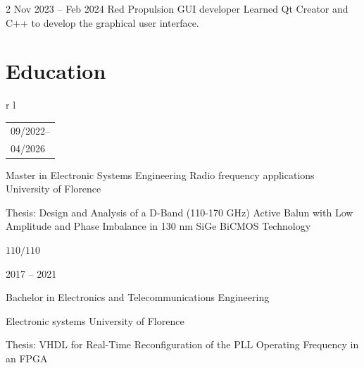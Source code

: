 \documentclass[
	10pt, %
]{FreemanCV}
\begin{document}
\begin{paracol}{2}
\jobentry
	{Nov 2023 -- Feb 2024} %
	{} %
	{Red Propulsion} %
	{GUI developer} %
	{Learned Qt Creator and C++ to develop the  graphical user interface.} %
%
\section{Education} 





\begin{supertabular}{r l} %

    \qualificationentrySecondType
    {\begin{tabular}[t]{@{}l@{}}
        09/2022--\\[-0.2em]
        04/2026
     \end{tabular}} %
		{Master in Electronic Systems Engineering} %
        {Radio frequency applications} %
        {University of Florence} %
		{\parbox[t]{7.1cm}{Thesis: Design and Analysis of a D-Band (110-170 GHz) Active Balun with Low Amplitude and Phase Imbalance in 130 nm SiGe BiCMOS Technology}} %
        {$110/110$}
		
	
	\qualificationentry
		{2017 -- 2021} %
        {\parbox[t]{7.3cm}{Bachelor in Electronics and Telecommunications Engineering}} %
        {Electronic systems} %
        {University of Florence} %
		{\parbox[t]{7.1cm}{Thesis: VHDL for Real-Time Reconfiguration of the PLL Operating Frequency in an FPGA}} %
		{}
	

\end{supertabular}
\end{paracol}
\end{document}
